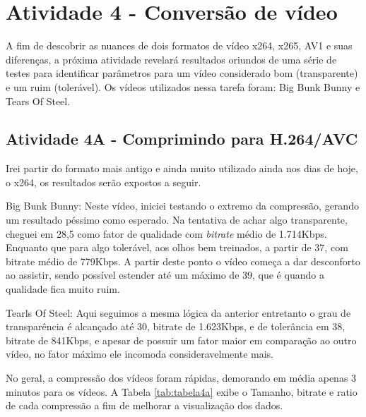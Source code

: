 \captionsetup{justification=centering,margin=0cm}
\label{cap:atividade4}  %

\chapter[Atividade 4 - Conversão de vídeo]{Atividade 4 - Conversão de vídeo}

A fim de descobrir as nuances de dois formatos de vídeo x264, x265, AV1 e suas diferenças, a próxima atividade revelará resultados oriundos de uma série de testes para identificar parâmetros para um vídeo considerado bom (transparente) e um ruim (tolerável). Os vídeos utilizados nessa tarefa foram: Big Bunk Bunny e Tears Of Steel.

\section{Atividade 4A - Comprimindo para H.264/AVC}
Irei partir do formato mais antigo e ainda muito utilizado ainda nos dias de hoje, o x264, os resultados serão expostos a seguir.

\paragrafo Big Bunk Bunny: Neste vídeo, iniciei testando o extremo da compressão, gerando um resultado péssimo como esperado. Na tentativa de achar algo transparente, cheguei em 28,5 como fator de qualidade com \textit{bitrate} médio de 1.714Kbps. Enquanto que para algo tolerável, aos olhos bem treinados, a partir de 37, com bitrate médio de 779Kbps. A partir deste ponto o vídeo começa a dar desconforto ao assistir, sendo possível estender até um máximo de 39, que é quando a qualidade fica muito ruim.

\paragrafo Tearls Of Steel: Aqui seguimos a mesma lógica da anterior entretanto o grau de transparência é alcançado até 30, bitrate de 1.623Kbps, e de tolerância em 38, bitrate de 841Kbps, e apesar de possuir um fator maior em comparação ao outro vídeo, no fator máximo ele incomoda consideravelmente mais. 

\paragrafo No geral, a compressão dos vídeos foram rápidas, demorando em média apenas 3 minutos para os vídeos. A Tabela \ref{tab:tabela4a} exibe o Tamanho, bitrate e ratio de cada compressão a fim de melhorar a visualização dos dados.

